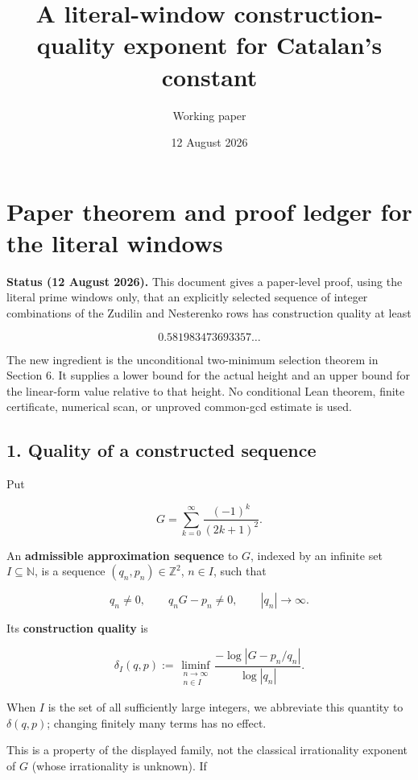 \documentclass[
  11pt,
]{article}
\title{A literal-window construction-quality exponent for Catalan's
constant}
\author{Working paper}
\date{12 August 2026}
\begin{document}
\maketitle

\hypertarget{paper-theorem-and-proof-ledger-for-the-literal-windows}{%
\section{Paper theorem and proof ledger for the literal
windows}\label{paper-theorem-and-proof-ledger-for-the-literal-windows}}

\textbf{Status (12 August 2026).} This document gives a paper-level
proof, using the literal prime windows only, that an explicitly selected
sequence of integer combinations of the Zudilin and Nesterenko rows has
construction quality at least

\[
  0.581983473693357\ldots
\]

The new ingredient is the unconditional two-minimum selection theorem in
Section 6. It supplies a lower bound for the actual height and an upper
bound for the linear-form value relative to that height. No conditional
Lean theorem, finite certificate, numerical scan, or unproved common-gcd
estimate is used.

\hypertarget{quality-of-a-constructed-sequence}{%
\subsection{1. Quality of a constructed
sequence}\label{quality-of-a-constructed-sequence}}

Put

\[
 G=\sum_{k=0}^{\infty}\frac{(-1)^k}{(2k+1)^2}.
\]

An \textbf{admissible approximation sequence} to \(G\), indexed by an
infinite set \(I\subseteq\mathbb N\), is a sequence
\((q_n,p_n)\in\mathbb Z^2\), \(n\in I\), such that

\[
 q_n\ne0,\qquad q_nG-p_n\ne0,\qquad |q_n|\longrightarrow\infty.
\]

Its \textbf{construction quality} is

\[
 \delta_I(q,p)
 :=\liminf_{\substack{n\to\infty\\n\in I}}
 \frac{-\log|G-p_n/q_n|}{\log|q_n|}.
 \tag{1.1}
\]

When \(I\) is the set of all sufficiently large integers, we abbreviate
this quantity to \(\delta(q,p)\); changing finitely many terms has no
effect.

This is a property of the displayed family, not the classical
irrationality exponent of \(G\) (whose irrationality is unknown). If
\end{document}
